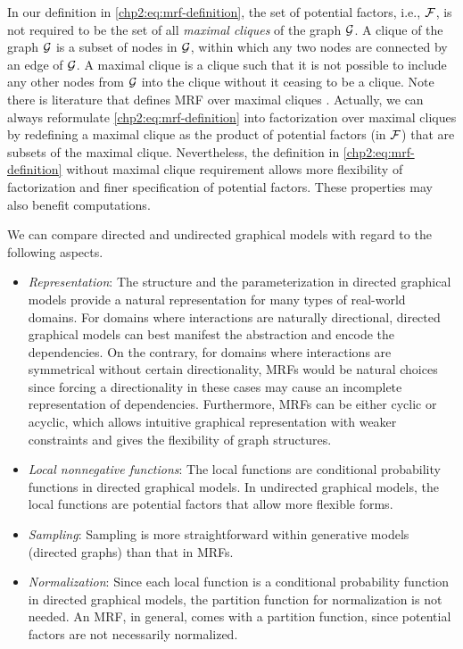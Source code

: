 \begin{remark}
In our definition in \eqref{chp2:eq:mrf-definition}, the set of potential factors, i.e., $\mathcal{F}$, is not required to be the set of all \textit{maximal cliques} of the graph $\mathcal{G}$. A clique of the graph $\mathcal{G}$ is a subset of nodes in $\mathcal{G}$, within which any two nodes are connected by an edge of $\mathcal{G}$. A maximal clique is a clique such that it is not possible to include any other nodes from $\mathcal{G}$ into the clique without it ceasing to be a clique. Note there is literature that defines MRF over maximal cliques \cite[Section~8.3.2]{Bishop:2006:PRM:1162264}. Actually, we can always reformulate \eqref{chp2:eq:mrf-definition} into factorization over maximal cliques by redefining a maximal clique as the product of potential factors (in $\mathcal{F}$) that are subsets of the maximal clique. Nevertheless, the definition in \eqref{chp2:eq:mrf-definition} without maximal clique requirement allows more flexibility of factorization and finer specification of potential factors. These properties may also benefit computations.
\end{remark}

\begin{remark}
  We can compare directed and undirected graphical models with regard to the following aspects.
  \begin{itemize}
  \item \textit{Representation}: The structure and the parameterization in directed graphical models provide a natural representation for many types of real-world domains. For domains where interactions are naturally directional, directed graphical models can best manifest the abstraction and encode the dependencies. On the contrary, for domains where interactions are symmetrical without certain directionality, MRFs would be natural choices since forcing a directionality in these cases may cause an incomplete representation of dependencies. Furthermore, MRFs can be either cyclic or acyclic, which allows intuitive graphical representation with weaker constraints and gives the flexibility of graph structures.
  \item \textit{Local nonnegative functions}: The local functions are conditional probability functions in directed graphical models. In undirected graphical models, the local functions are potential factors that allow more flexible forms.
  \item \textit{Sampling}: Sampling is more straightforward within generative models (directed graphs) than that in MRFs.
  \item \textit{Normalization}: Since each local function is a conditional probability function in directed graphical models, the partition function for normalization is not needed. An MRF, in general, comes with a partition function, since potential factors are not necessarily normalized.
  \end{itemize}
\end{remark}

